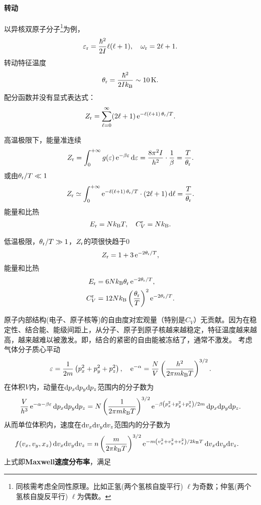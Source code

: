 \paragraph{转动}
以异核双原子分子\footnote{同核需考虑全同性原理。比如正氢(两个氢核自旋平行) $\ell$为奇数；仲氢(两个氢核自旋反平行) $\ell$为偶数。}为例，
\[
	\varepsilon_\mathrm r=\frac{\hbar^2}{2I}\ell(\ell+1),\quad\omega_\mathrm r=2\ell+1.
\]
转动特征温度
\[
	\theta_\rt=\frac{\hbar^2}{2I\kB}\sim\SI{10}\K.
\]
配分函数并没有显式表达式：
\[
	Z_\mathrm r=\sum_{\ell=0}^\infty(2\ell+1)\mathop{}\!\mathrm{e}^{-\ell(\ell+1)\,\theta_\mathrm r/T}.
\]
\begin{compactitem}
	\item
	高温极限下，能量准连续
	\[
		Z_\mathrm r=\int_0^{+\infty} g(\varepsilon)\mathop{}\!\mathrm{e}^{-\beta\varepsilon}\mathop{}\!\mathrm{d}\varepsilon=\frac{8\pi^2I}{h^2}\cdot\frac1\beta=\frac T{\theta_\mathrm r}.
	\]
	或由$\theta_\mathrm r/T\ll 1$
	\[
		Z_\mathrm r\simeq\int_0^{+\infty}\mathop{}\!\mathrm{e}^{-\ell(\ell+1)\,\theta_\mathrm r/T}\cdot(2\ell+1)\mathop{}\!\mathrm{d}\ell=\frac T{\theta_\mathrm r}.
	\]
	能量和比热
	\begin{align}
		E_\mathrm r=Nk_{\mathrm B} T,\quad C_V^\mathrm r=Nk_{\mathrm B}.
	\end{align}
	\item 
	低温极限，$\theta_\mathrm r/T\gg 1$，$Z_\mathrm r$的项很快趋于0
	\[
		Z_\mathrm r=1+3\mathop{}\!\mathrm{e}^{-2\theta_\mathrm r/T},
	\]
	能量和比热
	\begin{align}
		E_\mathrm r&=6Nk_{\mathrm B}\theta_\mathrm r\mathop{}\!\mathrm{e}^{-2\theta_\mathrm r/T},\\
		C_V^\mathrm r&=12Nk_{\mathrm B}\left(\frac{\theta_\mathrm r}T\right)^2\mathop{}\!\mathrm{e}^{-2\theta_\mathrm r/T}.
	\end{align}
\end{compactitem}
原子内部结构(电子、原子核等)的自由度对宏观量（特别是$C_V$）无贡献。因为在稳定性、结合能、能级间距上，从分子、原子到原子核越来越稳定，特征温度越来越高，越来越难以被激发。即，结合的紧密的自由能被冻结了，通常不激发。
考虑气体分子质心平动
\[
	\varepsilon=\frac1{2m}\left(p_x^2+p_y^2+p_z^2\right),\quad \mathop{}\!\mathrm{e}^{-\alpha}=\frac NV\left(\frac{h^2}{2\pi mk_{\mathrm B} T}\right)^{3/2}.
\]
在体积$V$内，动量在$\mathop{}\!\mathrm{d} p_x\mathrm{d} p_y\mathrm{d} p_z$范围内的分子数为
\[
	\frac V{h^3}\mathop{}\!\mathrm{e}^{-\alpha-\beta\varepsilon}\mathop{}\!\mathrm{d} p_x\mathrm{d} p_y\mathrm{d} p_z=N\left(\frac1{2\pi mk_{\mathrm B} T}\right)^{3/2}\mathop{}\!\mathrm{e}^{-\beta\left(p_x^2+p_y^2+p_z^2\right)/2m}\mathop{}\!\mathrm{d} p_x\mathrm{d} p_y\mathrm{d} p_z.
\]
从而单位体积内，速度在$\mathop{}\!\mathrm{d} v_x\mathrm{d} v_y\mathrm{d} v_z$范围内的分子数为
\begin{align}
	\begin{aligned}
		&f(v_x,v_y,x_z)\mathop{}\!\mathrm{d} v_x\mathrm{d} v_y\mathrm{d} v_z=n\left(\frac m{2\pi k_{\mathrm B} T}\right)^{3/2}\mathop{}\!\mathrm{e}^{-m\left(v_x^2+v_y^2+v_z^2\right)/2k_{\mathrm B} T}\mathop{}\!\mathrm{d} v_x\mathrm{d} v_y\mathrm{d} v_z.
	\end{aligned}
\end{align}
上式即\textbf{Maxwell速度分布率}，满足
